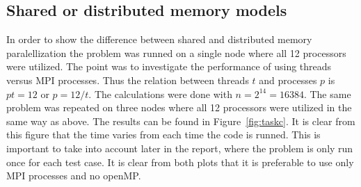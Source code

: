 \subsection{Shared or distributed memory models}
In order to show the difference between shared and distributed memory paralellization the problem was runned on a single node where all 12 processors were utilized. The point was to investigate the performance of using threads versus MPI processes. Thus the relation between threads $t$ and processes $p$ is $p t = 12$ or $p = 12/t$. The calculations were done with $n = 2^{14} = 16384$. 
The same problem was repeated on three nodes where all 12 processors were utilized in the same way as above. The results can be found in Figure~\ref{fig:taskc}. It is clear from this figure that the time varies from each time the code is runned. This is important to take into account later in the report, where the problem is only run once for each test case. It is clear from both plots that it is preferable to use only MPI processes and no openMP. 


